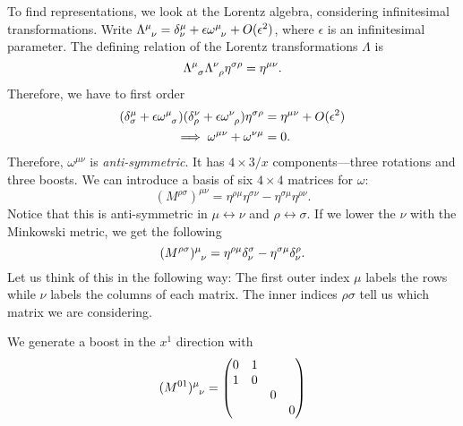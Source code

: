 To find representations, we look at the Lorentz algebra, considering infinitesimal transformations.
Write $\Lambda \indices{^{\mu}_{\nu}} = \delta^{\mu}_{\nu} + \epsilon \omega \indices{^{\mu}_{\nu}} + O(\epsilon^2)$, where $\epsilon$ is an infinitesimal parameter.
The defining relation of the Lorentz transformations $\Lambda$ is
\begin{equation}
  \Lambda \indices{^{\mu}_{\sigma}} \Lambda \indices{^{\nu}_{\rho}} \eta^{\sigma\rho} = \eta^{\mu\nu}.
\end{equation}
Therefore, we have to first order
\begin{align}
  (\delta^{\mu}_{\sigma} + \epsilon \omega \indices{^{\mu}_{\sigma}}) (\delta^{\nu}_{\rho} + \epsilon \omega \indices{^{\nu}_{\rho}}) \eta^{\sigma\rho} &= \eta^{\mu\nu} + O(\epsilon^2) \\
															  \implies \omega^{\mu\nu} + \omega^{\nu\mu} &= 0.
\end{align}
Therefore, $\omega^{\mu\nu}$ is \emph{anti-symmetric}.
It has $4 \times 3 / x$ components---three rotations and three boosts.
We can introduce a basis of six $4 \times 4$ matrices for $\omega$:
\begin{equation}
  (M^{\rho\sigma})^{\mu\nu} = \eta^{\rho\mu} \eta^{\sigma\nu} - \eta^{\sigma\mu} \eta^{\rho\nu}.
\end{equation}
Notice that this is anti-symmetric in $\mu \leftrightarrow \nu$ and $\rho \leftrightarrow \sigma$.
If we lower the $\nu$ with the Minkowski metric, we get the following
\begin{equation}
  \label{eq:13-lorentz-generators}
  (M^{\rho\sigma}) \indices{^{\mu}_{\nu}} = \eta^{\rho\mu} \delta^{\sigma}_{\nu} - \eta^{\sigma\mu} \delta^{\rho}_{\nu}.
\end{equation}
Let us think of this in the following way: The first outer index $\mu$ labels the rows while $\nu$ labels the columns of each matrix. The inner indices $\rho\sigma$ tell us which matrix we are considering.
\begin{example}[]
  We generate a boost in the $x^1$ direction with
  \begin{equation}
    (M^{01}) \indices{^{\mu}_{\nu}} = 
    \begin{pmatrix}
     0 & 1 &  &  \\
     1 & 0 &  &  \\
      &  & 0 &  \\
      &  &  & 0 \\
    \end{pmatrix}
  \end{equation}
\end{example}
